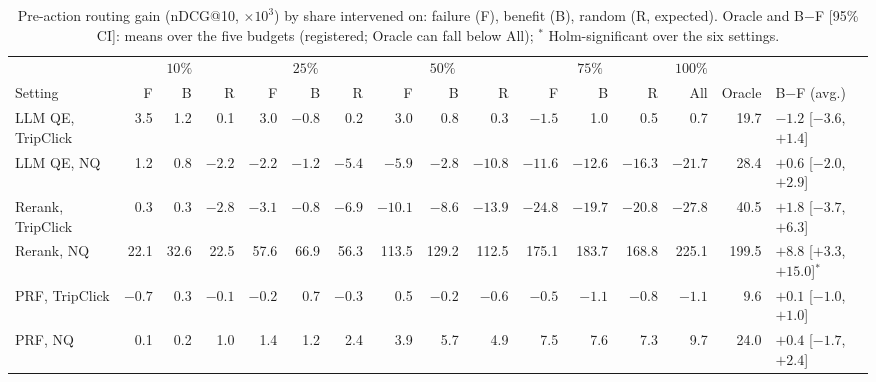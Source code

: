 \begin{table}[t]
\caption{Pre-action routing gain (nDCG@10,
$\times10^3$) by share intervened on: failure (F), benefit (B), random
(R, expected). Oracle and B$-$F
[95\% CI]: means over the five budgets (registered; Oracle can fall
below All); $^*$ Holm-significant over the six settings.}
\label{tab:routing}
\footnotesize
\setlength{\tabcolsep}{3pt}
\begin{tabular}{@{}lrrrrrrrrrrrrrrl@{}}
\toprule
 & \multicolumn{3}{c}{$10\%$} & \multicolumn{3}{c}{$25\%$} & \multicolumn{3}{c}{$50\%$} & \multicolumn{3}{c}{$75\%$} & $100\%$ & & \\
\cmidrule(lr){2-4}\cmidrule(lr){5-7}\cmidrule(lr){8-10}\cmidrule(lr){11-13}
Setting & F & B & R & F & B & R & F & B & R & F & B & R & All & Oracle & B$-$F (avg.) \\
\midrule
LLM QE, TripClick & 3.5 & 1.2 & 0.1 & 3.0 & $-0.8$ & 0.2 & 3.0 & 0.8 & 0.3 & $-1.5$ & 1.0 & 0.5 & 0.7 & 19.7 & $-1.2$ [$-3.6$, $+1.4$] \\
LLM QE, NQ & 1.2 & 0.8 & $-2.2$ & $-2.2$ & $-1.2$ & $-5.4$ & $-5.9$ & $-2.8$ & $-10.8$ & $-11.6$ & $-12.6$ & $-16.3$ & $-21.7$ & 28.4 & $+0.6$ [$-2.0$, $+2.9$] \\
Rerank, TripClick & 0.3 & 0.3 & $-2.8$ & $-3.1$ & $-0.8$ & $-6.9$ & $-10.1$ & $-8.6$ & $-13.9$ & $-24.8$ & $-19.7$ & $-20.8$ & $-27.8$ & 40.5 & $+1.8$ [$-3.7$, $+6.3$] \\
Rerank, NQ & 22.1 & 32.6 & 22.5 & 57.6 & 66.9 & 56.3 & 113.5 & 129.2 & 112.5 & 175.1 & 183.7 & 168.8 & 225.1 & 199.5 & $+8.8$ [$+3.3$, $+15.0$]$^*$ \\
PRF, TripClick & $-0.7$ & 0.3 & $-0.1$ & $-0.2$ & 0.7 & $-0.3$ & 0.5 & $-0.2$ & $-0.6$ & $-0.5$ & $-1.1$ & $-0.8$ & $-1.1$ & 9.6 & $+0.1$ [$-1.0$, $+1.0$] \\
PRF, NQ & 0.1 & 0.2 & 1.0 & 1.4 & 1.2 & 2.4 & 3.9 & 5.7 & 4.9 & 7.5 & 7.6 & 7.3 & 9.7 & 24.0 & $+0.4$ [$-1.7$, $+2.4$] \\
\bottomrule
\end{tabular}
\end{table}
